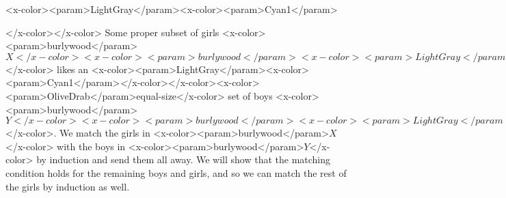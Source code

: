 {<x-color><param>LightGray</param><x-color><param>Cyan1</param>\item</x-color></x-color> Some proper subset of girls <x-color><param>burlywood</param>$X </x-color><x-color><param>burlywood</param><x-color><param>LightGray</param>\subset</x-color></x-color><x-color><param>burlywood</param> G$</x-color> likes an <x-color><param>LightGray</param><x-color><param>Cyan1</param>\emph</x-color></x-color><x-color><param>OliveDrab</param>{equal-size}</x-color>
  set of boys <x-color><param>burlywood</param>$Y </x-color><x-color><param>burlywood</param><x-color><param>LightGray</param>\subset</x-color></x-color><x-color><param>burlywood</param> B$</x-color>.  We match the girls in <x-color><param>burlywood</param>$X$</x-color> with the boys in
  <x-color><param>burlywood</param>$Y$</x-color> by induction and send them all away.  We will show that the matching
  condition holds for the remaining boys and girls, and so we can match
  the rest of the girls by induction as well.

}
